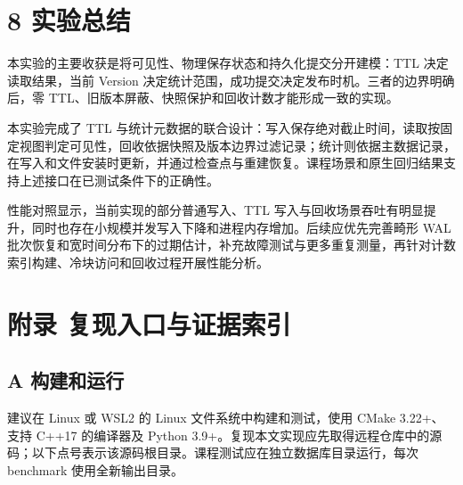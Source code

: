\documentclass[UTF8,a4paper,10pt,twocolumn,fontset=fandol]{ctexart}
\begin{document}
\section*{8 实验总结}
本实验的主要收获是将可见性、物理保存状态和持久化提交分开建模：TTL 决定读取结果，当前 Version 决定统计范围，成功提交决定发布时机。三者的边界明确后，零 TTL、旧版本屏蔽、快照保护和回收计数才能形成一致的实现。

本实验完成了 TTL 与统计元数据的联合设计：写入保存绝对截止时间，读取按固定视图判定可见性，回收依据快照及版本边界过滤记录；统计则依据主数据记录，在写入和文件安装时更新，并通过检查点与重建恢复。课程场景和原生回归结果支持上述接口在已测试条件下的正确性。

性能对照显示，当前实现的部分普通写入、TTL 写入与回收场景吞吐有明显提升，同时也存在小规模并发写入下降和进程内存增加。后续应优先完善畸形 WAL 批次恢复和宽时间分布下的过期估计，补充故障测试与更多重复测量，再针对计数索引构建、冷块访问和回收过程开展性能分析。

\section*{附录 复现入口与证据索引}
\subsection*{A 构建和运行}
建议在 Linux 或 WSL2 的 Linux 文件系统中构建和测试，使用 CMake 3.22+、支持 C++17 的编译器及 Python 3.9+。复现本文实现应先取得远程仓库中的源码；以下点号表示该源码根目录。课程测试应在独立数据库目录运行，每次 benchmark 使用全新输出目录。
\end{document}
